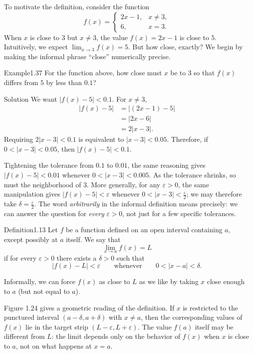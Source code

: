 \documentclass[a4paper,12pt,oneside]{memoir}
\begin{document}
To motivate the definition, consider the function \[ f(x) = \begin{cases} 2x - 1, & x \neq 3,\\[4pt] 6, & x = 3. \end{cases} \] When \(x\) is close to \(3\) but \(x \neq 3\), the value \(f(x) = 2x - 1\) is close to \(5\). Intuitively, we expect \(\lim_{x \to 3} f(x) = 5\). But how close, exactly? We begin by making the informal phrase “close” numerically precise.

\begin{workedexample}
\begin{envexample}{Example}{1.37}{}
For the function above, how close must \(x\) be to \(3\) so that \(f(x)\) differs from \(5\) by less than \(0.1\)?
\end{envexample}
\begin{envsolution}{Solution}{}{}
We want \(|f(x) - 5| < 0.1\). For \(x \neq 3\), \[ \begin{aligned} |f(x) - 5| &= |(2x - 1) - 5|\\ &= |2x - 6|\\ &= 2 |x - 3|. \end{aligned} \] Requiring \(2 |x - 3| < 0.1\) is equivalent to \(|x - 3| < 0.05\). Therefore, if \(0 < |x - 3| < 0.05\), then \(|f(x) - 5| < 0.1\).
\end{envsolution}
\end{workedexample}
Tightening the tolerance from \(0.1\) to \(0.01\), the same reasoning gives \(|f(x) - 5| < 0.01\) whenever \(0 < |x - 3| < 0.005\). As the tolerance shrinks, so must the neighborhood of \(3\). More generally, for any \(\varepsilon > 0\), the same manipulation gives \(|f(x) - 5| < \varepsilon\) whenever \(0 < |x - 3| < \tfrac{\varepsilon}{2}\); we may therefore take \(\delta = \tfrac{\varepsilon}{2}\). The word \emph{arbitrarily} in the informal definition means precisely: we can answer the question for \emph{every} \(\varepsilon > 0\), not just for a few specific tolerances.

\begin{envdefinition}{Definition}{1.13}{}
Let \(f\) be a function defined on an open interval containing \(a\), except possibly at \(a\) itself. We say that \[ \lim_{x \to a} f(x) = L \] if for every \(\varepsilon > 0\) there exists a \(\delta > 0\) such that \[ |f(x) - L| < \varepsilon \qquad \text{whenever} \qquad 0 < |x - a| < \delta. \]

\begin{informal}
Informally, we can force \(f(x)\) as close to \(L\) as we like by taking \(x\) close enough to \(a\) (but not equal to \(a\)).
\end{informal}
\end{envdefinition}
Figure 1.24 gives a geometric reading of the definition. If \(x\) is restricted to the punctured interval \((a - \delta, a + \delta)\) with \(x \neq a\), then the corresponding values of \(f(x)\) lie in the target strip \((L - \varepsilon, L + \varepsilon)\). The value \(f(a)\) itself may be different from \(L\): the limit depends only on the behavior of \(f(x)\) when \(x\) is close to \(a\), not on what happens at \(x = a\).
\end{document}
